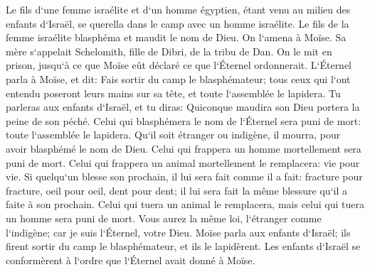 \verse Le fils d`une femme israélite et d`un homme égyptien, étant venu au milieu des enfants d`Israël, se querella dans le camp avec un homme israélite. 
\verse Le fils de la femme israélite blasphéma et maudit le nom de Dieu. On l`amena à Moïse. Sa mère s`appelait Schelomith, fille de Dibri, de la tribu de Dan. 
\verse On le mit en prison, jusqu`à ce que Moïse eût déclaré ce que l`Éternel ordonnerait. 
\verse L`Éternel parla à Moïse, et dit: 
\verse Fais sortir du camp le blasphémateur; tous ceux qui l`ont entendu poseront leurs mains sur sa tête, et toute l`assemblée le lapidera. 
\verse Tu parleras aux enfants d`Israël, et tu diras: Quiconque maudira son Dieu portera la peine de son péché. 
\verse Celui qui blasphémera le nom de l`Éternel sera puni de mort: toute l`assemblée le lapidera. Qu`il soit étranger ou indigène, il mourra, pour avoir blasphémé le nom de Dieu. 
\verse Celui qui frappera un homme mortellement sera puni de mort. 
\verse Celui qui frappera un animal mortellement le remplacera: vie pour vie. 
\verse Si quelqu`un blesse son prochain, il lui sera fait comme il a fait: 
\verse fracture pour fracture, oeil pour oeil, dent pour dent; il lui sera fait la même blessure qu`il a faite à son prochain. 
\verse Celui qui tuera un animal le remplacera, mais celui qui tuera un homme sera puni de mort. 
\verse Vous aurez la même loi, l`étranger comme l`indigène; car je suis l`Éternel, votre Dieu. 
\verse Moïse parla aux enfants d`Israël; ils firent sortir du camp le blasphémateur, et ils le lapidèrent. Les enfants d`Israël se conformèrent à l`ordre que l`Éternel avait donné à Moïse. 

